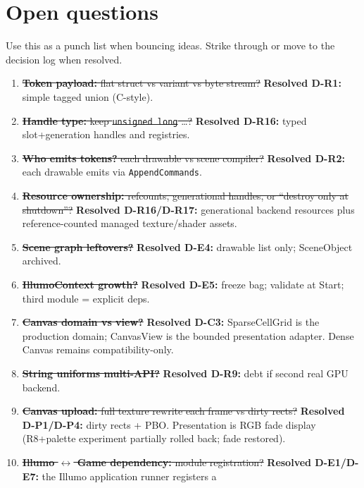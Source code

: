 \section{Open questions}
\label{sec:open}

Use this as a punch list when bouncing ideas. Strike through or move to the
decision log when resolved.

\begin{openbox}
\begin{enumerate}
  \item \sout{\textbf{Token payload:} flat struct vs variant vs byte stream?}
        \textbf{Resolved D-R1:} simple tagged union (C-style).
  \item \sout{\textbf{Handle type:} keep \texttt{unsigned long} \ldots?}
        \textbf{Resolved D-R16:} typed slot+generation handles and registries.
  \item \sout{\textbf{Who emits tokens?} each drawable vs scene compiler?}
        \textbf{Resolved D-R2:} each drawable emits via \texttt{AppendCommands}.
  \item \sout{\textbf{Resource ownership:} refcounts, generational handles, or
        ``destroy only at shutdown''?}
        \textbf{Resolved D-R16/D-R17:} generational backend resources plus
        reference-counted managed texture/shader assets.
  \item \sout{\textbf{Scene graph leftovers?}}
        \textbf{Resolved D-E4:} drawable list only; SceneObject archived.
  \item \sout{\textbf{IllumoContext growth?}}
        \textbf{Resolved D-E5:} freeze bag; validate at Start; third module =
        explicit deps.
  \item \sout{\textbf{Canvas domain vs view?}}
        \textbf{Resolved D-C3:} SparseCellGrid is the production domain;
        CanvasView is the bounded presentation adapter. Dense Canvas remains
        compatibility-only.
  \item \sout{\textbf{String uniforms multi-API?}}
        \textbf{Resolved D-R9:} debt if second real GPU backend.
  \item \sout{\textbf{Canvas upload:} full texture rewrite each frame vs dirty rects?}
        \textbf{Resolved D-P1/D-P4:} dirty rects + PBO. Presentation is RGB
        fade display (R8+palette experiment partially rolled back; fade restored).
  \item \sout{\textbf{Illumo $\leftrightarrow$ Game dependency:} module registration?}
        \textbf{Resolved D-E1/D-E7:} the Illumo application runner registers a

\end{enumerate}
\end{openbox}
